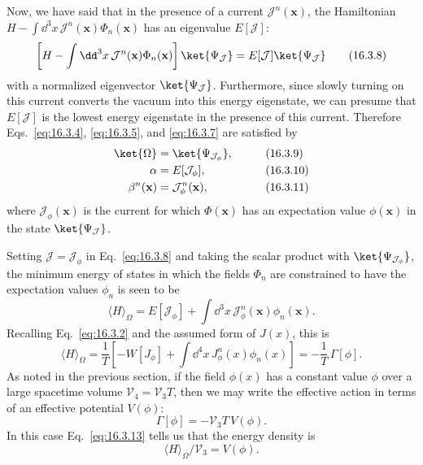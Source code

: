 Now, we have said that in the presence of a current $\mathcal J^n(\mathbf{x})$, the Hamiltonian $H-\int \dd^3x\,\mathcal J^n(\mathbf{x})\Phi_n(\mathbf{x})$ has an eigenvalue $E[\mathcal J]$:
\begin{equation}
\left[H-\int \dd^3x\,\mathcal J^n(\mathbf{x})\Phi_n(\mathbf{x})\right]
\ket{\Psi_{\mathcal J}}
=E[\mathcal J]\ket{\Psi_{\mathcal J}}
\tag{16.3.8}\label{eq:16.3.8}
\end{equation}
with a normalized eigenvector $\ket{\Psi_{\mathcal J}}$. Furthermore, since slowly turning on this current converts the vacuum into this energy eigenstate, we can presume that $E[\mathcal J]$ is the lowest energy eigenstate in the presence of this current. Therefore Eqs.~\eqref{eq:16.3.4}, \eqref{eq:16.3.5}, and \eqref{eq:16.3.7} are satisfied by
\begin{align}
\ket{\Omega}&=\ket{\Psi_{\mathcal J_\phi}},
&&\tag{16.3.9}\label{eq:16.3.9}\\
\alpha&=E[\mathcal J_\phi],
&&\tag{16.3.10}\label{eq:16.3.10}\\
\beta^n(\mathbf{x})&=\mathcal J_\phi^n(\mathbf{x}),
&&\tag{16.3.11}\label{eq:16.3.11}
\end{align}
where $\mathcal J_\phi(\mathbf{x})$ is the current for which $\Phi(\mathbf{x})$ has an expectation value $\phi(\mathbf{x})$ in the state $\ket{\Psi_{\mathcal J}}$.

Setting $\mathcal J=\mathcal J_\phi$ in Eq.~\eqref{eq:16.3.8} and taking the scalar product with $\ket{\Psi_{\mathcal J_\phi}}$, the minimum energy of states in which the fields $\Phi_n$ are constrained to have the expectation values $\phi_n$ is seen to be
\begin{equation}
\langle H\rangle_\Omega
=E[\mathcal J_\phi]
+\int \dd^3x\,\mathcal J_\phi^n(\mathbf{x})\phi_n(\mathbf{x}).
\tag{16.3.12}\label{eq:16.3.12}
\end{equation}
Recalling Eq.~\eqref{eq:16.3.2} and the assumed form of $J(x)$, this is
\begin{equation}
\langle H\rangle_\Omega
=\frac{1}{T}\left[-W[J_\phi]
+\int \dd^4x\,J_\phi^n(x)\phi_n(x)\right]
=-\frac{1}{T}\,\Gamma[\phi].
\tag{16.3.13}\label{eq:16.3.13}
\end{equation}
As noted in the previous section, if the field $\phi(x)$ has a constant value $\phi$ over a large spacetime volume $\mathcal V_4=\mathcal V_3T$, then we may write the effective action in terms of an effective potential $V(\phi)$:
\begin{equation}
\Gamma[\phi]=-\mathcal V_3T\,V(\phi).
\tag{16.3.14}\label{eq:16.3.14}
\end{equation}
In this case Eq.~\eqref{eq:16.3.13} tells us that the energy density is
\begin{equation}
\langle H\rangle_\Omega/\mathcal V_3=V(\phi).
\tag{16.3.15}\label{eq:16.3.15}
\end{equation}

